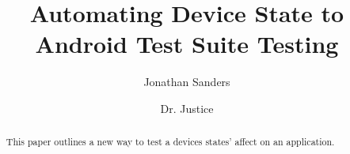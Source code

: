 \documentclass[sigconf]{acmart}
\begin{document}
\title{Automating Device State to Android Test Suite Testing }

\author{Jonathan Sanders}

\author{Dr. Justice}





\begin{abstract}
This paper outlines a new way to test a devices states' affect on an application.  
\end{abstract}





\maketitle




 
\end{document}
